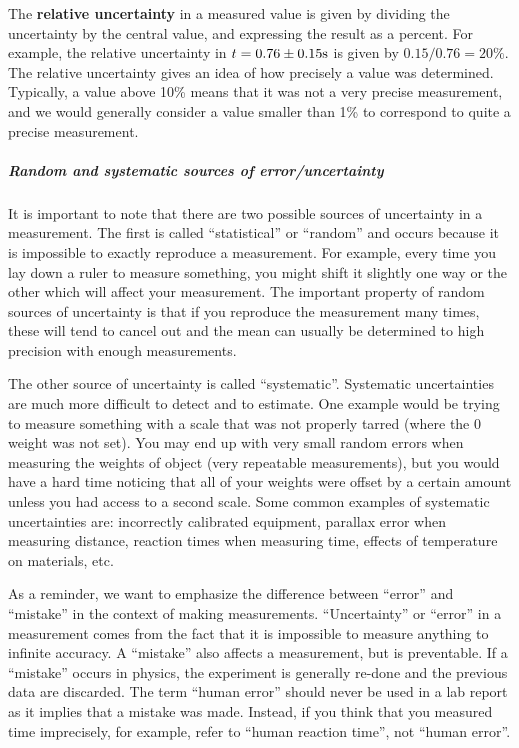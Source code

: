 The \textbf{relative uncertainty} in a measured value is given by dividing the uncertainty by the central value, and expressing the result as a percent. For example, the relative uncertainty in $t=0.76\pm 0.15 {\rm s}$ is given by $0.15/0.76=20\%$. The relative uncertainty gives an idea of how precisely a value was determined. Typically, a value above 10\% means that it was not a very precise measurement, and we would generally consider a value smaller than 1\% to correspond to quite a precise measurement.

\subparagraph{Random and systematic sources of error/uncertainty}

It is important to note that there are two possible sources of uncertainty in a measurement. The first is called ``statistical'' or ``random'' and occurs because it is impossible to exactly reproduce a measurement. For example, every time you lay down a ruler to measure something, you might shift it slightly one way or the other which will affect your measurement. The important property of random sources of uncertainty is that if you reproduce the measurement many times, these will tend to cancel out and the mean can usually be determined to high precision with enough measurements.

The other source of uncertainty is called ``systematic''. Systematic uncertainties are much more difficult to detect and to estimate. One example would be trying to measure something with a scale that was not properly tarred (where the 0 weight was not set). You may end up with very small random errors when measuring the weights of object (very repeatable measurements), but you would have a hard time noticing that all of your weights were offset by a certain amount unless you had access to a second scale. Some common examples of systematic uncertainties are: incorrectly calibrated equipment, parallax error when measuring distance, reaction times when measuring time, effects of temperature on materials, etc.

As a reminder, we want to emphasize the difference between ``error'' and ``mistake'' in the context of making measurements. ``Uncertainty'' or ``error'' in a measurement comes from the fact that it is impossible to measure anything to infinite accuracy. A ``mistake'' also affects a measurement, but is preventable. If a ``mistake'' occurs in physics, the experiment is generally re-done and the previous data are discarded. The term ``human error'' should never be used in a lab report as it implies that a mistake was made. Instead, if you think that you measured time imprecisely, for example, refer to ``human reaction time'', not ``human error''.

